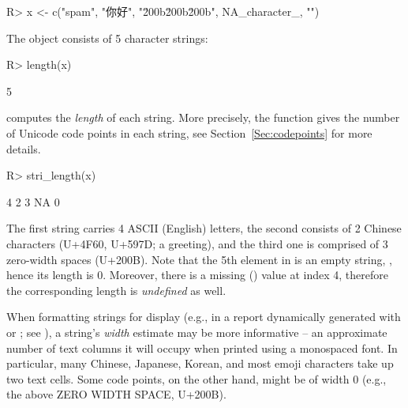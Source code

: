 \documentclass[nojss]{jss}
\begin{document}
\begin{Schunk}
\begin{Sinput}
R> x <- c("spam", "你好", "\u200b\u200b\u200b", NA_character_, "")
\end{Sinput}
\end{Schunk}

The  object consists of 5 character strings:

\begin{Schunk}
\begin{Sinput}
R> length(x)
\end{Sinput}
\begin{Soutput}
[1] 5
\end{Soutput}
\end{Schunk}


 computes the \textit{length} of each string.
More precisely, the function gives the number of Unicode code points
in each string, see Section~\ref{Sec:codepoints} for more details.

\begin{Schunk}
\begin{Sinput}
R> stri_length(x)
\end{Sinput}
\begin{Soutput}
[1]  4  2  3 NA  0
\end{Soutput}
\end{Schunk}

\noindent
The first string carries 4 ASCII (English) letters,
the second consists of 2 Chinese characters (U+4F60, U+597D; a greeting),
and the third one is comprised of 3 zero-width spaces (U+200B).
Note that the 5th element in  is an empty string, ,
hence its length is  0.
Moreover, there is a missing () value
at index 4, therefore the corresponding length is \textit{undefined} as well.




When formatting strings for display
(e.g., in a report dynamically generated with 
or ; see \citealp{knitr}),
a string's \textit{width} estimate may be more informative --
an approximate number of text columns it will occupy when printed
using a monospaced font.
In particular, many Chinese, Japanese, Korean, and most emoji
characters take up two text cells. Some code points, on the other hand,
might be of width 0 (e.g., the above ZERO WIDTH SPACE, U+200B).
\end{document}
